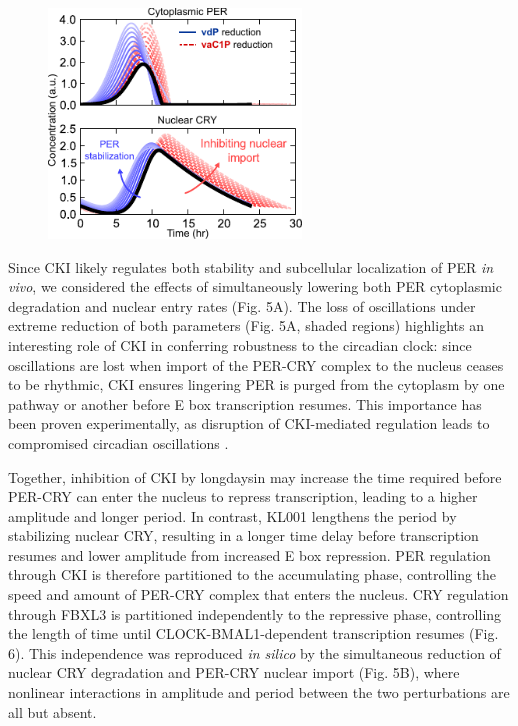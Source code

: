 \begin{figure}[h]
  \centering
  \includegraphics[width=0.6\textwidth]{chap4/figures/fig4c.pdf}
  \label{fig:44c}
\end{figure}


Since CKI likely regulates both stability and subcellular localization of PER
{\it in vivo}, we considered the effects of simultaneously lowering both PER
cytoplasmic degradation and nuclear entry rates (Fig. 5A).  The loss of
oscillations under extreme reduction of both parameters (Fig. 5A, shaded
regions) highlights an interesting role of CKI in conferring robustness to the
circadian clock: since oscillations are lost when import of the PER-CRY complex
to the nucleus ceases to be rhythmic, CKI ensures lingering PER is purged from
the cytoplasm by one pathway or another before E box transcription resumes.
This importance has been proven experimentally, as disruption of CKI-mediated
regulation leads to compromised circadian oscillations \cite{Lee2009a}.

Together, inhibition of CKI by longdaysin may increase the time required
before PER-CRY can enter the nucleus to repress transcription, leading to a
higher amplitude and longer period. In contrast, KL001 lengthens the period by
stabilizing nuclear CRY, resulting in a longer time delay before transcription
resumes and lower amplitude from increased E box repression. PER regulation
through CKI is therefore partitioned to the accumulating phase, controlling the
speed and amount of PER-CRY complex that enters the nucleus. CRY regulation
through FBXL3 is partitioned independently to the repressive phase, controlling
the length of time until CLOCK-BMAL1-dependent transcription resumes (Fig. 6). This
independence was reproduced {\it in silico} by the simultaneous reduction of
nuclear CRY degradation and PER-CRY nuclear import (Fig. 5B), where nonlinear
interactions in amplitude and period between the two perturbations are all but
absent.

